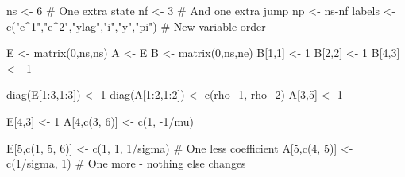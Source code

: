 \documentclass[
  letterpaper,
]{book}
\newenvironment{Shaded}{\begin{snugshade}}{\end{snugshade}}
\newcommand{\CommentTok}[1]{\textcolor[rgb]{0.37,0.37,0.37}{#1}}
\newcommand{\DecValTok}[1]{\textcolor[rgb]{0.68,0.00,0.00}{#1}}
\newcommand{\FunctionTok}[1]{\textcolor[rgb]{0.28,0.35,0.67}{#1}}
\newcommand{\NormalTok}[1]{\textcolor[rgb]{0.00,0.23,0.31}{#1}}
\newcommand{\OtherTok}[1]{\textcolor[rgb]{0.00,0.23,0.31}{#1}}
\newcommand{\SpecialCharTok}[1]{\textcolor[rgb]{0.37,0.37,0.37}{#1}}
\newcommand{\StringTok}[1]{\textcolor[rgb]{0.13,0.47,0.30}{#1}}
\begin{document}
\begin{Shaded}
\begin{Highlighting}[]
\NormalTok{ns }\OtherTok{\textless{}{-}} \DecValTok{6}      \CommentTok{\# One extra state}
\NormalTok{nf }\OtherTok{\textless{}{-}} \DecValTok{3}      \CommentTok{\# And one extra jump}
\NormalTok{np }\OtherTok{\textless{}{-}}\NormalTok{ ns}\SpecialCharTok{{-}}\NormalTok{nf}
\NormalTok{labels }\OtherTok{\textless{}{-}} \FunctionTok{c}\NormalTok{(}\StringTok{"e\^{}1"}\NormalTok{,}\StringTok{"e\^{}2"}\NormalTok{,}\StringTok{"ylag"}\NormalTok{,}\StringTok{"i"}\NormalTok{,}\StringTok{"y"}\NormalTok{,}\StringTok{"pi"}\NormalTok{) }\CommentTok{\# New variable order}

\NormalTok{E }\OtherTok{\textless{}{-}} \FunctionTok{matrix}\NormalTok{(}\DecValTok{0}\NormalTok{,ns,ns)}
\NormalTok{A }\OtherTok{\textless{}{-}}\NormalTok{ E}
\NormalTok{B }\OtherTok{\textless{}{-}} \FunctionTok{matrix}\NormalTok{(}\DecValTok{0}\NormalTok{,ns,ne)}
\NormalTok{B[}\DecValTok{1}\NormalTok{,}\DecValTok{1}\NormalTok{] }\OtherTok{\textless{}{-}} \DecValTok{1}
\NormalTok{B[}\DecValTok{2}\NormalTok{,}\DecValTok{2}\NormalTok{] }\OtherTok{\textless{}{-}} \DecValTok{1}
\NormalTok{B[}\DecValTok{4}\NormalTok{,}\DecValTok{3}\NormalTok{] }\OtherTok{\textless{}{-}} \SpecialCharTok{{-}}\DecValTok{1}

\FunctionTok{diag}\NormalTok{(E[}\DecValTok{1}\SpecialCharTok{:}\DecValTok{3}\NormalTok{,}\DecValTok{1}\SpecialCharTok{:}\DecValTok{3}\NormalTok{]) }\OtherTok{\textless{}{-}} \DecValTok{1}
\FunctionTok{diag}\NormalTok{(A[}\DecValTok{1}\SpecialCharTok{:}\DecValTok{2}\NormalTok{,}\DecValTok{1}\SpecialCharTok{:}\DecValTok{2}\NormalTok{]) }\OtherTok{\textless{}{-}} \FunctionTok{c}\NormalTok{(rho\_1, rho\_2)}
\NormalTok{A[}\DecValTok{3}\NormalTok{,}\DecValTok{5}\NormalTok{]           }\OtherTok{\textless{}{-}} \DecValTok{1}

\NormalTok{E[}\DecValTok{4}\NormalTok{,}\DecValTok{3}\NormalTok{]           }\OtherTok{\textless{}{-}} \DecValTok{1}
\NormalTok{A[}\DecValTok{4}\NormalTok{,}\FunctionTok{c}\NormalTok{(}\DecValTok{3}\NormalTok{, }\DecValTok{6}\NormalTok{)]     }\OtherTok{\textless{}{-}} \FunctionTok{c}\NormalTok{(}\DecValTok{1}\NormalTok{, }\SpecialCharTok{{-}}\DecValTok{1}\SpecialCharTok{/}\NormalTok{mu)}

\NormalTok{E[}\DecValTok{5}\NormalTok{,}\FunctionTok{c}\NormalTok{(}\DecValTok{1}\NormalTok{, }\DecValTok{5}\NormalTok{, }\DecValTok{6}\NormalTok{)]  }\OtherTok{\textless{}{-}} \FunctionTok{c}\NormalTok{(}\DecValTok{1}\NormalTok{, }\DecValTok{1}\NormalTok{, }\DecValTok{1}\SpecialCharTok{/}\NormalTok{sigma) }\CommentTok{\# One less coefficient}
\NormalTok{A[}\DecValTok{5}\NormalTok{,}\FunctionTok{c}\NormalTok{(}\DecValTok{4}\NormalTok{, }\DecValTok{5}\NormalTok{)]     }\OtherTok{\textless{}{-}} \FunctionTok{c}\NormalTok{(}\DecValTok{1}\SpecialCharTok{/}\NormalTok{sigma, }\DecValTok{1}\NormalTok{)    }\CommentTok{\# One more {-} nothing else changes}


\end{Highlighting}
\end{Shaded}
\end{document}
